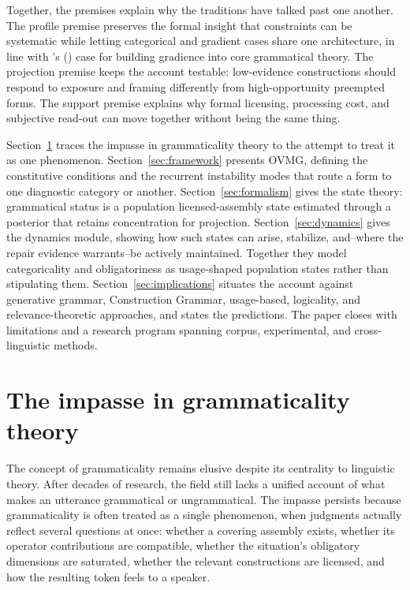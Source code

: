 \documentclass[12pt,letterpaper]{article}
\newcommand{\posscite}[1]{\citeauthor{#1}'s (\citeyear{#1})}
\begin{document}
Together, the premises explain why the traditions have talked past one another. The profile premise preserves the formal insight that constraints can be systematic while letting categorical and gradient cases share one architecture, in line with \posscite{francis2022} case for building gradience into core grammatical theory. The projection premise keeps the account testable: low-evidence constructions should respond to exposure and framing differently from high-opportunity preempted forms. The support premise explains why formal licensing, processing cost, and subjective read-out can move together without being the same thing.

Section~\ref{sec:previous} traces the impasse in grammaticality theory to the attempt to treat it as one phenomenon. Section~\ref{sec:framework} presents OVMG, defining the constitutive conditions and the recurrent instability modes that route a form to one diagnostic category or another. Section~\ref{sec:formalism} gives the state theory: grammatical status is a population licensed-assembly state estimated through a posterior that retains concentration for projection. Section~\ref{sec:dynamics} gives the dynamics module, showing how such states can arise, stabilize, and--where the repair evidence warrants--be actively maintained. Together they model categoricality and obligatoriness as usage-shaped population states rather than stipulating them. Section~\ref{sec:implications} situates the account against generative grammar, Construction Grammar, usage-based, logicality, and relevance-theoretic approaches, and states the predictions. The paper closes with limitations and a research program spanning corpus, experimental, and cross-linguistic methods.

\section{The impasse in grammaticality theory}\label{sec:previous}

The concept of grammaticality remains elusive despite its centrality to linguistic theory. After decades of research, the field still lacks a unified account of what makes an utterance grammatical or ungrammatical. The impasse persists because grammaticality is often treated as a single phenomenon, when judgments actually reflect several questions at once: whether a covering assembly exists, whether its operator contributions are compatible, whether the situation's obligatory dimensions are saturated, whether the relevant constructions are licensed, and how the resulting token feels to a speaker.
\end{document}
